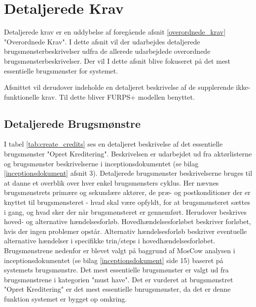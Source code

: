 \section{Detaljerede Krav}

Detaljerede krav er en uddybelse af foregående afsnit \ref{overordnede_krav} "Overordnede Krav". I dette afsnit vil der udarbejdes detaljerede brugsmønsterbeskrivelser udfra de allerede udarbejdede overordnede brugsmønsterbeskrivelser. Der vil I dette afsnit blive fokuseret på det mest essentielle brugsmønster for systemet.

Afsnittet vil derudover indeholde en detaljeret beskrivelse af de supplerende ikke-funktionelle krav. Til dette bliver FURPS+ modellen benyttet.


\subsection{Detaljerede Brugsmønstre} {\label{section: detailed_usemodels}}
I tabel \ref{tab:create_credits} ses en detaljeret beskrivelse af det essentielle brugsmønster "Opret Kreditering".
Beskrivelsen er udarbejdet ud fra aktørlisterne og brugsmønster beskrivelserne i inceptionsdokumentet (se bilag \ref{inceptionsdokument} afsnit 3). Detaljerede brugsmønster beskrivelserne bruges til at danne et overblik over hver enkel brugsmønsters cyklus. Her nævnes brugsmønstrets primære og sekundære aktører, de præ- og postkonditioner der er knyttet til brugsmønsteret - hvad skal være opfyldt, for at brugsmønsteret sættes i gang, og hvad sker der når brugsmønsteret er gennemført. Herudover beskrives hoved- og alternative hændelsesforløb. Hovedhændelsesforløbet beskriver forløbet, hvis der ingen problemer opstår. Alternativ hændelsesforløb beskriver eventuelle alternative hændelser i specifikke trin/steps i hovedhændelsesforløbet. \\

Brugsmønstrene nedenfor er blevet valgt på baggrund af MosCow analysen i inceptionsdokumentet (se bilag \ref{inceptionsdokument} side 15) baseret på systemets brugsmønstre. Det mest essentielle brugsmønster er valgt ud fra brugsmønstrene i kategorien "must have". Det er vurderet at brugsmønstret "Opret Kreditering" er det mest essentielle bnrugsmønster, da det er denne funktion systemet er bygget op omkring.\\

